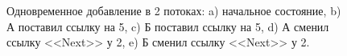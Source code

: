 \documentclass[12pt]{article}
\begin{document}
{\begin{figure}[h!]
\begin{minipage}[h]{0.45\linewidth}
{						\label{pic:doubleInsertC}
					}
				\end{minipage}
				\hfill
				\begin{minipage}[h]{0.45\linewidth}
					\center {}
				\end{minipage}
				\begin{minipage}[h]{0.45\linewidth}
					\center {}
				\end{minipage}
				\caption{Одновременное добавление в 2 потоках: a) начальное состояние, b) А поставил ссылку на 5, c) Б поставил ссылку на 5, d) А сменил ссылку <<Next>> у 2, e) Б сменил ссылку <<Next>> у 2.}
			\end{figure}
}
\end{document}
